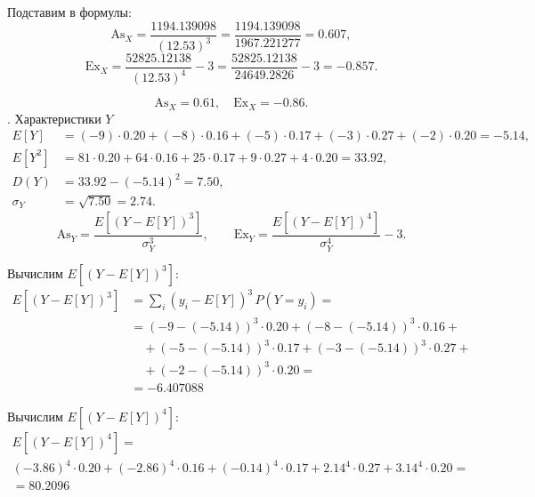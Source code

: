 \documentclass[a4paper,14pt]{extarticle}
\begin{document}
            Подставим в формулы:
            \[
                \mathrm{As}_X = \frac{1194.139098}{(12.53)^3} = \frac{1194.139098}{1967.221277} = 0.607,
            \]
            \[
                \mathrm{Ex}_X = \frac{52825.12138}{(12.53)^4} - 3 = \frac{52825.12138}{24649.2826} - 3 = -0.857.
            \]
            
            \[
                \boxed{\mathrm{As}_X = 0.61, \quad \mathrm{Ex}_X = -0.86.}
            \]
            . Характеристики $Y$
            \[
                \begin{aligned}
                    E[Y] &= (-9)\cdot0.20 + (-8)\cdot0.16 + (-5)\cdot0.17 + (-3)\cdot0.27 + (-2)\cdot0.20 = -5.14,\\
                    E[Y^2] &= 81\cdot0.20 + 64\cdot0.16 + 25\cdot0.17 + 9\cdot0.27 + 4\cdot0.20 = 33.92,\\
                    D(Y) &= 33.92 - (-5.14)^2 = 7.50,\\
                    \sigma_Y &= \sqrt{7.50} = 2.74.
                \end{aligned}
            \]
            \[
                \mathrm{As}_Y = \frac{E[(Y - E[Y])^3]}{\sigma_Y^3},
                \qquad
                \mathrm{Ex}_Y = \frac{E[(Y - E[Y])^4]}{\sigma_Y^4} - 3.
            \]
            
            Вычислим $E[(Y - E[Y])^3]$:
            \[
                \begin{aligned}
                    E[(Y - E[Y])^3] &= \sum_i (y_i - E[Y])^3 \, P(Y=y_i) = \\
                    &= (-9 - (-5.14))^3 \cdot 0.20 + (-8 - (-5.14))^3 \cdot 0.16 + \\
                    &\quad + (-5 - (-5.14))^3 \cdot 0.17 + (-3 - (-5.14))^3 \cdot 0.27 + \\
                    &\quad + (-2 - (-5.14))^3 \cdot 0.20 = \\
                    & = -6.407088
                \end{aligned}
            \]
            
            Вычислим $E[(Y - E[Y])^4]$:
            \begin{gather*}
                E[(Y - E[Y])^4] = \\
                (-3.86)^4 \cdot 0.20 + (-2.86)^4 \cdot 0.16 + (-0.14)^4 \cdot 0.17 + 2.14^4 \cdot 0.27 + 3.14^4 \cdot 0.20 = \\
                = 80.2096
            \end{gather*}
            
\end{document}
